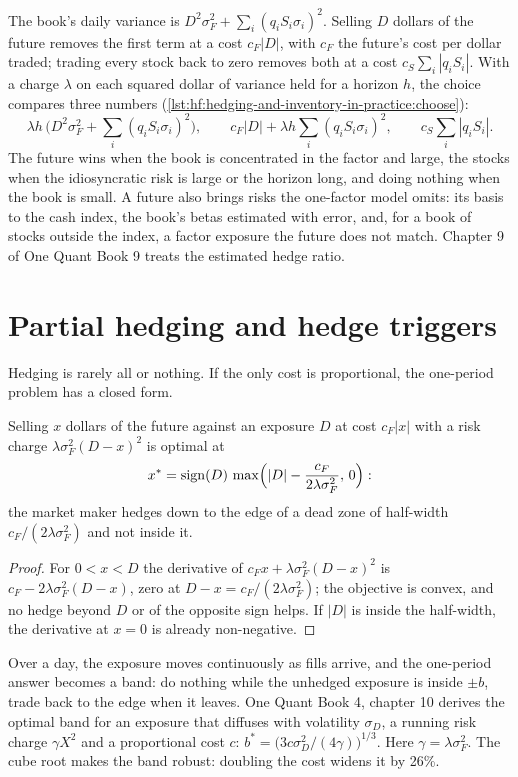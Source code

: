 The book's daily variance is $D^2\sigma_F^2+\sum_i (q_iS_i\sigma_i)^2$. Selling $D$ dollars of the future removes the first term at a cost $c_F|D|$,
with $c_F$ the future's cost per dollar traded; trading every stock back to zero removes both at a cost $c_S\sum_i|q_iS_i|$. With a charge $\lambda$
on each squared dollar of variance held for a horizon $h$, the choice compares three numbers (\cref{lst:hf:hedging-and-inventory-in-practice:choose}):
\[
\lambda h\,\bigl(D^2\sigma_F^2+\textstyle\sum_i(q_iS_i\sigma_i)^2\bigr),\qquad c_F|D|+\lambda h\textstyle\sum_i(q_iS_i\sigma_i)^2,\qquad c_S\textstyle\sum_i|q_iS_i|.
\]
The future wins when the book is concentrated in the factor and large, the stocks when the idiosyncratic risk is large or the horizon long, and doing
nothing when the book is small. A future also brings risks the one-factor model omits: its basis to the cash index, the book's betas estimated with
error, and, for a book of stocks outside the index, a factor exposure the future does not match. Chapter 9 of One Quant Book 9 treats the
estimated hedge ratio.

\section{Partial hedging and hedge triggers}

Hedging is rarely all or nothing. If the only cost is proportional, the one-period problem has a closed form.

\begin{proposition}\label{prop:hf:hedging-and-inventory-in-practice:dead}
Selling $x$ dollars of the future against an exposure $D$ at cost $c_F|x|$ with a risk charge $\lambda\sigma_F^2(D-x)^2$ is optimal at
\[
x^\ast=\operatorname{sign}(D)\,\max\Bigl(|D|-\frac{c_F}{2\lambda\sigma_F^2},\,0\Bigr):
\]
the market maker hedges down to the edge of a dead zone of half-width $c_F/(2\lambda\sigma_F^2)$ and not inside it.
\end{proposition}

\begin{proof}
For $0<x<D$ the derivative of $c_Fx+\lambda\sigma_F^2(D-x)^2$ is $c_F-2\lambda\sigma_F^2(D-x)$, zero at $D-x=c_F/(2\lambda\sigma_F^2)$; the objective is
convex, and no hedge beyond $D$ or of the opposite sign helps. If $|D|$ is inside the half-width, the derivative at $x=0$ is already non-negative.
\end{proof}

Over a day, the exposure moves continuously as fills arrive, and the one-period answer becomes a band: do nothing while the unhedged exposure is
inside $\pm b$, trade back to the edge when it leaves. One Quant Book 4, chapter 10 derives the optimal band for an exposure that diffuses with
volatility $\sigma_D$, a running risk charge $\gamma X^2$ and a proportional cost $c$: $b^\ast=\bigl(3c\sigma_D^2/(4\gamma)\bigr)^{1/3}$. Here
$\gamma=\lambda\sigma_F^2$. The cube root makes the band robust: doubling the cost widens it by 26\%.


